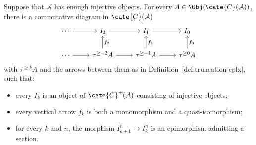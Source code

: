 \begin{lemma}\label{prop:K-injective-truncated}
	Suppose that $\mathcal{A}$ has enough injective objects. For every
	$A\in\Obj(\cate{C}(\mathcal{A}))$, there is a commutative diagram in
	$\cate{C}(\mathcal{A})$
	\[\begin{tikzcd}
		\cdots \arrow[r] & I_2 \arrow[r] & I_1 \arrow[r] & I_0 \\
		\cdots \arrow[r] & \tau^{\geq -2} A\arrow[u, "f_2"'] \arrow[r] &
		\tau^{\geq -1} A \arrow[r] \arrow[u, "f_1"'] &
		\tau^{\geq 0} A \arrow[u, "f_0"']
	\end{tikzcd}\]
	with $\tau^{\geq k}A$ and the arrows between them as in
	Definition~\ref{def:truncation-cplx}, such that:
	\begin{itemize}
		\item every $I_k$ is an object of
		$\cate{C}^+(\mathcal{A})$ consisting of injective objects;
		\item every vertical arrow $f_k$ is both a monomorphism and a
		quasi-isomorphism;
		\item for every $k$ and $n$, the morphism
		$I_{k+1}^n\to I_k^n$ is an epimorphism admitting a section.
	\end{itemize}
\end{lemma}

